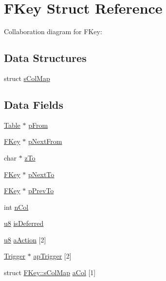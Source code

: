 \hypertarget{struct_f_key}{}\section{F\+Key Struct Reference}
\label{struct_f_key}


Collaboration diagram for F\+Key\+:
\subsection*{Data Structures}
\begin{DoxyCompactItemize}
\item 
struct \hyperlink{struct_f_key_1_1s_col_map}{s\+Col\+Map}
\end{DoxyCompactItemize}
\subsection*{Data Fields}
\begin{DoxyCompactItemize}
\item 
\hyperlink{struct_table}{Table} $\ast$ \hyperlink{struct_f_key_a220ca0bcddde67932809283beba982f1}{p\+From}
\item 
\hyperlink{struct_f_key}{F\+Key} $\ast$ \hyperlink{struct_f_key_aef3af72659b611fc8a7858451ab133cc}{p\+Next\+From}
\item 
char $\ast$ \hyperlink{struct_f_key_a8b36f3339f6976ec3aa9fc2f8901ec2a}{z\+To}
\item 
\hyperlink{struct_f_key}{F\+Key} $\ast$ \hyperlink{struct_f_key_a667382be15447b434268f99968fedefc}{p\+Next\+To}
\item 
\hyperlink{struct_f_key}{F\+Key} $\ast$ \hyperlink{struct_f_key_a1e3a1d05b53abc60d688138e8ab4387e}{p\+Prev\+To}
\item 
int \hyperlink{struct_f_key_a354f4c2d87e40ee3eab3758d0716280e}{n\+Col}
\item 
\hyperlink{sqlite3_8c_a74a0f6424ae628af25f23f0a35f6ead3}{u8} \hyperlink{struct_f_key_a05adbc8674f021661354ad607d00b0ac}{is\+Deferred}
\item 
\hyperlink{sqlite3_8c_a74a0f6424ae628af25f23f0a35f6ead3}{u8} \hyperlink{struct_f_key_a3368c776d894b09143824e0257497c7d}{a\+Action} \mbox{[}2\mbox{]}
\item 
\hyperlink{struct_trigger}{Trigger} $\ast$ \hyperlink{struct_f_key_afa7faa6dac9fc2f244023e14e121906b}{ap\+Trigger} \mbox{[}2\mbox{]}
\item 
struct \hyperlink{struct_f_key_1_1s_col_map}{F\+Key\+::s\+Col\+Map} \hyperlink{struct_f_key_a0a3363a8d4b79b754bc4b6566fa64d3b}{a\+Col} \mbox{[}1\mbox{]}
\end{DoxyCompactItemize}


